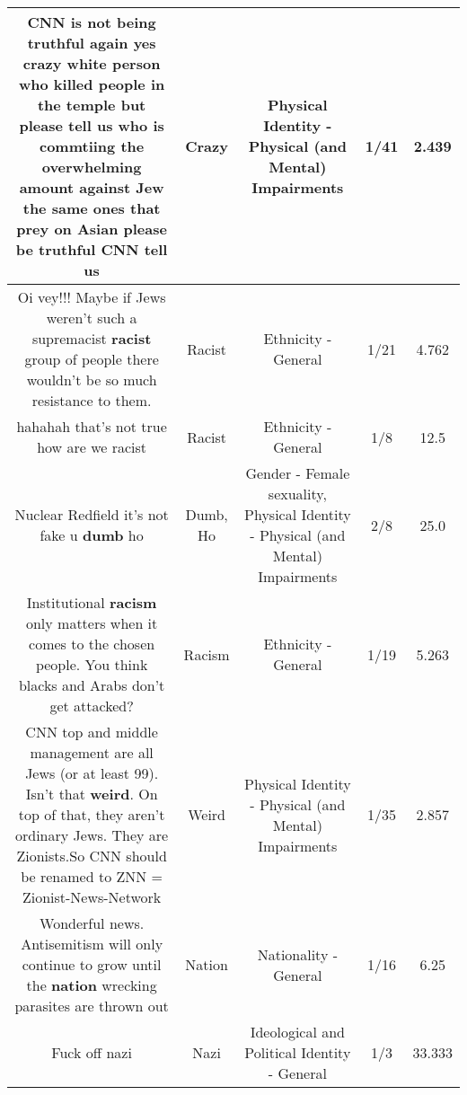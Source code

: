 \documentclass[11pt]{article}
\newlength\mylength
\begin{document}
\begin{center}
\begin{longtable}{|C{.65\mylength}|C{.30\mylength}|C{.12\mylength}|C{.12\mylength}|C{.12\mylength}|}
  \small CNN is not being truthful again  yes \textbf{crazy} white person who killed people in the temple  but please tell us who is commtiing the overwhelming amount against Jew  the same ones that prey on Asian   please be truthful CNN tell us\normalsize   & Crazy & Physical Identity - Physical (and Mental) Impairments & 1/41 & 2.439 \\  \hline
  \small Oi vey!!! Maybe if Jews weren't such a supremacist \textbf{racist} group of people there wouldn't be so much resistance to them.\normalsize   & Racist & Ethnicity - General & 1/21 & 4.762 \\  \hline
  \small hahahah that's not true how are we racist\normalsize   & Racist & Ethnicity - General & 1/8 & 12.5 \\  \hline
  \small Nuclear Redfield it's not fake u \textbf{dumb} ho\normalsize   & Dumb, Ho & Gender - Female sexuality, Physical Identity - Physical (and Mental) Impairments & 2/8 & 25.0 \\  \hline
  \small Institutional \textbf{racism} only matters when it comes to the chosen people. You think blacks and Arabs don't get attacked?\normalsize   & Racism & Ethnicity - General & 1/19 & 5.263 \\  \hline
  \small CNN top and middle management are all Jews (or at least 99). Isn't that \textbf{weird}. On top of that, they aren't ordinary Jews. They are Zionists.So CNN should be renamed to ZNN  =  Zionist-News-Network\normalsize   & Weird & Physical Identity - Physical (and Mental) Impairments & 1/35 & 2.857 \\  \hline
  \small Wonderful news. Antisemitism will only continue to grow until the \textbf{nation} wrecking parasites are thrown out\normalsize   & Nation & Nationality - General & 1/16 & 6.25 \\  \hline
  \small Fuck off nazi\normalsize   & Nazi &  Ideological and Political Identity - General & 1/3 & 33.333 \\  \hline

\end{longtable}
\end{center}
\end{document}
